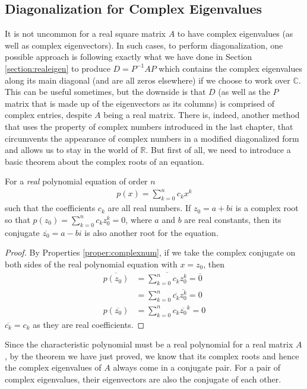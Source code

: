 \subsection{Diagonalization for Complex Eigenvalues}
\label{subsection:diagcomplex}
It is not uncommon for a real square matrix $A$ to have complex eigenvalues (as well as complex eigenvectors). In such cases, to perform diagonalization, one possible approach is following exactly what we have done in Section \ref{section:realeigen} to produce $D = P^{-1}AP$ which contains the complex eigenvalues along its main diagonal (and are all zeros elsewhere) if we choose to work over $\mathbb{C}$. This can be useful sometimes, but the downside is that $D$ (as well as the $P$ matrix that is made up of the eigenvectors as its columns) is comprised of complex entries, despite $A$ being a real matrix. There is, indeed, another method that uses the property of complex numbers introduced in the last chapter, that circumvents the appearance of complex numbers in a modified diagonalized form and allows us to stay in the world of $\mathbb{R}$. But first of all, we need to introduce a basic theorem about the complex roots of an equation.
\begin{thm}
For a \textit{real} polynomial equation of order $n$
\begin{align*}
p(x) = \sum_{k=0}^{n} c_k x^k
\end{align*}
such that the coefficients $c_k$ are all real numbers. If $z_0 = a+bi$ is a complex root so that $p(z_0) = \sum_{k=0}^{n} c_k z_0^k = 0$, where $a$ and $b$ are real constants, then its conjugate $\overline{z_0} = a-bi$ is also another root for the equation.
\end{thm}
\begin{proof}
By Properties \ref{proper:complexnum}, if we take the complex conjugate on both sides of the real polynomial equation with $x = z_0$, then
\begin{align*}
\overline{p(z_0)} &= \overline{\sum_{k=0}^{n} c_k z_0^k} = \overline{0} \\
&= \sum_{k=0}^{n} \overline{c_k} \overline{z_0^k} = 0 \\
{p(\overline{z_0})} &= \sum_{k=0}^{n} c_k \overline{z_0}^k = 0
\end{align*}
$\overline{c_k} = c_k$ as they are real coefficients.
\end{proof}
Since the characteristic polynomial must be a real polynomial for a real matrix $A$, by the theorem we have just proved, we know that its complex roots and hence the complex eigenvalues of $A$ always come in a conjugate pair. For a pair of complex eigenvalues, their eigenvectors are also the conjugate of each other.
